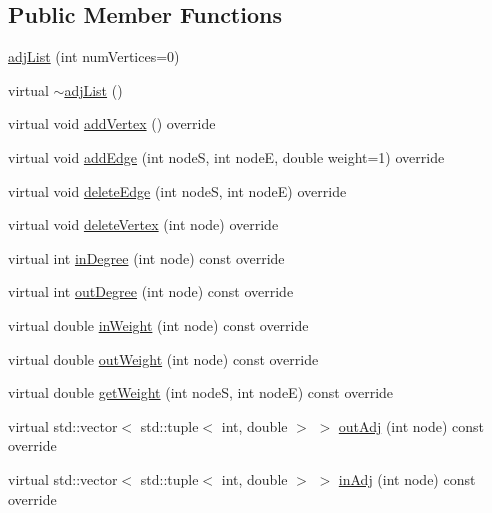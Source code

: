 \subsection*{Public Member Functions}
\begin{DoxyCompactItemize}
\item 
\hyperlink{class_alg_lib_1_1adj_list_a5e849290c4eb81596d9940d689826099}{adj\+List} (int num\+Vertices=0)
\item 
virtual \hyperlink{class_alg_lib_1_1adj_list_a2dea5320bf4658b69cad9c31e7bf4ae7}{$\sim$adj\+List} ()
\item 
virtual void \hyperlink{class_alg_lib_1_1adj_list_a15380331b1b6b6b510052b5e43f4ba50}{add\+Vertex} () override
\item 
virtual void \hyperlink{class_alg_lib_1_1adj_list_a1010763e586866d884ebb769df8fba52}{add\+Edge} (int nodeS, int nodeE, double weight=1) override
\item 
virtual void \hyperlink{class_alg_lib_1_1adj_list_a11ced2c2ac3cc989e9c23c6e63dc41c5}{delete\+Edge} (int nodeS, int nodeE) override
\item 
virtual void \hyperlink{class_alg_lib_1_1adj_list_a37fa96194420fd556668dc8c4ce5472f}{delete\+Vertex} (int node) override
\item 
virtual int \hyperlink{class_alg_lib_1_1adj_list_a73b55f7e622358e9ac4f2dbd076b393d}{in\+Degree} (int node) const  override
\item 
virtual int \hyperlink{class_alg_lib_1_1adj_list_a3bb70be60dc28fedf1817c76f5b881f2}{out\+Degree} (int node) const  override
\item 
virtual double \hyperlink{class_alg_lib_1_1adj_list_a74fbc3342cdd18cfbd1a3c26982d03a0}{in\+Weight} (int node) const  override
\item 
virtual double \hyperlink{class_alg_lib_1_1adj_list_aeeabf593091f0d068f77d5ed000ab06b}{out\+Weight} (int node) const  override
\item 
virtual double \hyperlink{class_alg_lib_1_1adj_list_a1f365ed028dd4bdce2fc47119f47dde7}{get\+Weight} (int nodeS, int nodeE) const  override
\item 
virtual std\+::vector$<$ std\+::tuple$<$ int, double $>$ $>$ \hyperlink{class_alg_lib_1_1adj_list_a01a7eb08e676f75a339403079e004e00}{out\+Adj} (int node) const  override
\item 
virtual std\+::vector$<$ std\+::tuple$<$ int, double $>$ $>$ \hyperlink{class_alg_lib_1_1adj_list_a2f8f4af6435990aea3b90b3274bf64bf}{in\+Adj} (int node) const  override
\end{DoxyCompactItemize}
